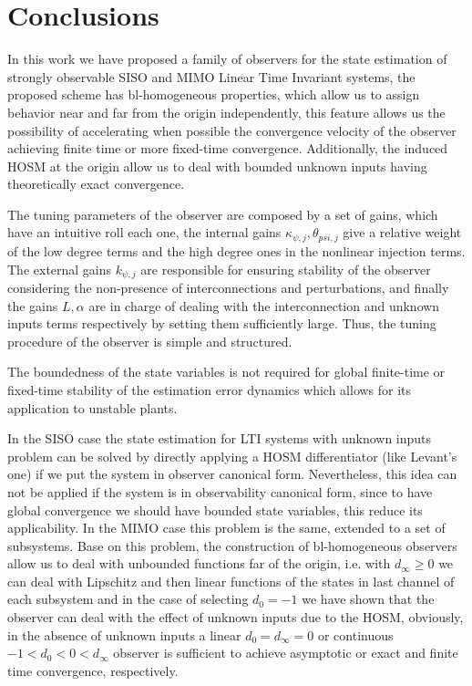 \documentclass[11pt,letterpaper,twoside,openright]{report}
\begin{document}
\chapter{Conclusions}
In this work we have proposed a family of observers for the state estimation of strongly observable SISO and MIMO Linear Time Invariant systems, the proposed scheme has bl-homogeneous properties, which allow us to assign behavior near and far from the origin independently, this feature allows us the possibility of accelerating when possible the convergence velocity of the observer achieving finite time or more fixed-time convergence. Additionally, the induced HOSM at the origin allow us to deal with bounded unknown inputs having theoretically exact convergence.

The tuning parameters of the observer are composed by a set of gains, which have an intuitive roll each one, the internal gains $\kappa_{\psi,j},\theta_{psi,j}$ give a relative weight of the low degree terms and the high degree ones in the nonlinear injection terms. The external gains $k_{\psi,j}$ are responsible for ensuring stability of the observer considering the non-presence of interconnections and perturbations, and finally the gains $L,\alpha$ are in charge of dealing with the interconnection and unknown inputs terms respectively by setting them sufficiently large. Thus, the tuning procedure of the observer is simple and structured.

The boundedness of the state variables is not required for global finite-time or fixed-time stability of the estimation error dynamics which allows for its application to unstable plants.

In the SISO case the state estimation for LTI systems with unknown inputs problem can be solved by directly applying a HOSM differentiator (like Levant's one) if we put the system in observer canonical form. Nevertheless, this idea can not be applied if the system is in observability canonical form, since to have global convergence we should have bounded state variables, this reduce its applicability. In the MIMO case this problem is the same, extended to a set of subsystems. Base on this problem, the construction of bl-homogeneous observers allow us to deal with unbounded functions far of the origin, i.e. with $d_{\infty}\geq 0$ we can deal with Lipschitz and then linear functions of the states in last channel of each subsystem and in the case of selecting $d_0=-1$ we have shown that the observer can deal with the effect of unknown inputs due to the HOSM, obviously, in the absence of unknown inputs a linear $d_0=d_{\infty}=0$ or continuous $-1<d_0< 0 < d_{\infty}$ observer is sufficient to achieve asymptotic or exact and finite time convergence, respectively.
\end{document}
